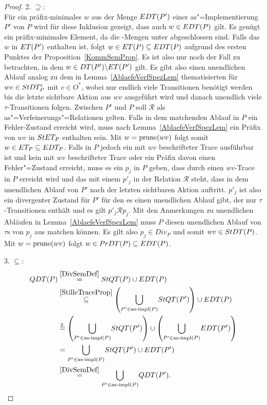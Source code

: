 \begin{proof}
  2. \glqq$\supseteq$\grqq{}:\\
  Für ein präfix-minimales $w$ aus der Menge $EDT (P')$ einer
  as"=Implementierung $P'$ von $P$ wird für diese Inklusion gezeigt, dass auch
  $w\in EDT (P)$ gilt. Es genügt ein präfix-minimales Element, da die
  \EDT{}-Mengen unter \cont{} abgeschlossen sind. Falls das $w$ in $ET (P')$
  enthalten ist, folgt $w\in ET (P) \subseteq EDT (P)$ aufgrund des ersten
  Punktes der Proposition~\ref{KommSemProp}. Es ist also nur noch der Fall zu
  betrachten, in dem $w\in DT (P') \backslash ET (P')$ gilt. Es gibt also
  einen unendlichen Ablauf analog zu dem in Lemma~\ref{AblaefeVerfSpezLem}
  thematisierten für $wv\in StDT _P'$ mit $v\in O^*$, wobei nur endlich viele
  Transitionen benötigt werden bis die letzte sichtbare Aktion aus $wv$
  ausgeführt wird und danach unendlich viele $\tau$-Transitionen folgen.
  Zwischen $P'$ und $P$ soll $\mathcal{R}$ als as"=Verfeinerungs"=Relationen
  gelten. Falls in dem matchenden Ablauf in $P$ ein Fehler-Zustand erreicht
  wird, muss nach Lemma~\ref{AblaefeVerfSpezLem} ein Präfix von $wv$ in $StET
  _P$ enthalten sein. Mit $w=\mathrm{prune} (wv)$ folgt somit $w\in ET _P \subseteq
  EDT_P$. Falls in $P$ jedoch ein mit $wv$ beschrifteter Trace ausführbar ist
  und kein mit $wv$ beschrifteter Trace oder ein Präfix davon einen
  Fehler"=Zustand erreicht, muss es ein $p_j$ in $P$ geben, dass durch einen
  $wv$-Trace in $P$ erreicht wird und das mit einem $p'_j$ in der Relation
  $\mathcal{R}$ steht, dass in dem unendlichen Ablauf von $P'$ nach der letzten
  sichtbaren Aktion auftritt. $p'_j$ ist also ein divergenter Zustand für $P'$
  für den es einen unendlichen Ablauf gibt, der nur $\tau$-Transitionen enthält
  und es gilt $p'_j\mathcal{R} p_j$. Mit den Anmerkungen zu unendlichen
  Abläufen in Lemma~\ref{AblaefeVerfSpezLem} muss $P$ diesen unendlichen Ablauf
  von $\tau$s von $p_j$ aus matchen können. Es gilt also $p_j\in Div _P$ und
  somit $wv\in StDT (P)$. Mit $w=\mathrm{prune} (wv)$ folgt $w\in PrDT (P) \subseteq
  EDT (P)$.

  3. \glqq$\subseteq$\grqq{}:
  {\allowdisplaybreaks
  \begin{align*}
    QDT (P)&\overset{\ref{DivSemDef}}{=} StQT (P)\cup EDT (P)\\
    &\overset{\ref{StilleTraceProp}}{\subseteq} \left(\underset{P'\in \mathrm{as}\text{-}\mathrm{impl}
    (P)}{\bigcup} StQT (P')\right)\cup EDT (P)\\
    &\overset{2.}{=} \left(\underset{P'\in \mathrm{as}\text{-}\mathrm{impl} (P)}{\bigcup} StQT
    (P')\right)\cup \left(\underset{P'\in \mathrm{as}\text{-}\mathrm{impl} (P)}{\bigcup} EDT
    (P')\right)\\
    &= \underset{P'\in \mathrm{as}\text{-}\mathrm{impl} (P)}{\bigcup} StQT (P') \cup EDT (P')\\
    &\overset{\ref{DivSemDef}}{=} \underset{P'\in\mathrm{as}\text{-}\mathrm{impl} (P)}{\bigcup} QDT
    (P').
  \end{align*}}


\end{proof}
